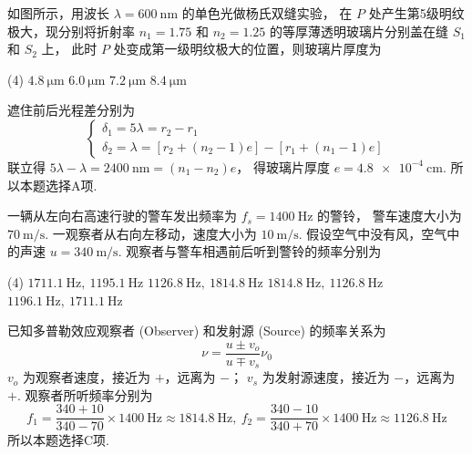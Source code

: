 \begin{textfig}
  \begin{problem}
    如图所示，用波长 $\lambda = \qty{600}\nm$ 的单色光做杨氏双缝实验，
    在 $P$ 处产生第5级明纹极大，现分别将折射率 $n_1 = 1.75$ 和 $n_2 = 1.25$
    的等厚薄透明玻璃片分别盖在缝 $S_1$ 和 $S_2$ 上，
    此时 $P$ 处变成第一级明纹极大的位置，则玻璃片厚度为
    \begin{tasks}(4)
      \task $\qty{4.8}\um$
      \task $\qty{6.0}\um$
      \task $\qty{7.2}\um$
      \task $\qty{8.4}\um$
    \end{tasks}
  \end{problem}
  \textfigsplit\centering
\end{textfig}
\scratch
\begin{solution}
  遮住前后光程差分别为
  \[
    \begin{cases}
      \delta_1 = 5\lambda = r_2 - r_1\\
      \delta_2 = \lambda = [r_2 + (n_2 - 1)e] - [r_1 + (n_1 - 1)e]
    \end{cases}
  \]
  联立得 $5\lambda - \lambda = \qty{2400}\nm = (n_1 - n_2)e$，
  得玻璃片厚度 $e = \qty{4.8e-4}\cm$. 所以本题选择A项.
\end{solution}

\begin{problem}
  一辆从左向右高速行驶的警车发出频率为 $f_s = \qty{1400}\Hz$ 的警铃，
  警车速度大小为 $\qty{70}{\m/\s}$. 一观察者从右向左移动，速度大小为 $\qty{10}{\m/\s}$.
  假设空气中没有风，空气中的声速 $u = \qty{340}{\m/\s}$.
  观察者与警车相遇前后听到警铃的频率分别为
  \begin{tasks}(4)
    \task $\qty{1711.1}\Hz,~ \qty{1195.1}\Hz$
    \task $\qty{1126.8}\Hz,~ \qty{1814.8}\Hz$
    \task[\true] $\qty{1814.8}\Hz,~ \qty{1126.8}\Hz$
    \task $\qty{1196.1}\Hz,~ \qty{1711.1}\Hz$
  \end{tasks}
\end{problem}
\scratch
\begin{solution}
  已知多普勒效应观察者 (Observer) 和发射源 (Source) 的频率关系为
  \[\nu = \frac{u\pm v_o}{u\mp v_s}\nu_0\]
  $v_o$ 为观察者速度，接近为 $+$，远离为 $-$；
  $v_s$ 为发射源速度，接近为 $-$，远离为 $+$. 观察者所听频率分别为
  \[
    f_1 = \frac{340 + 10}{340 - 70} \times \qty{1400}\Hz
        \approx \qty{1814.8}\Hz,~
    f_2 = \frac{340 - 10}{340 + 70} \times \qty{1400}\Hz
        \approx \qty{1126.8}\Hz
  \]
  所以本题选择C项.
\end{solution}

